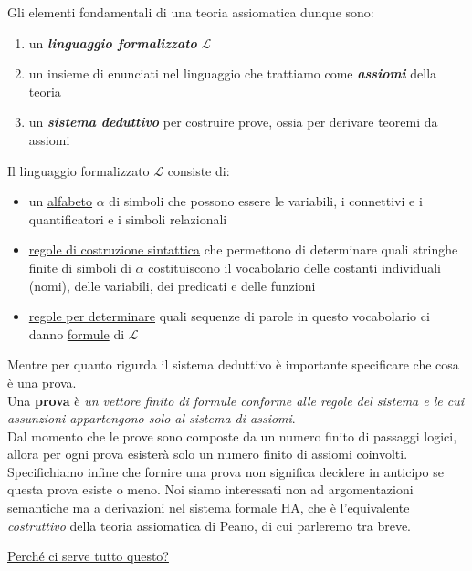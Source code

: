\vspace{0.4 cm}
Gli elementi fondamentali di una teoria assiomatica dunque sono:
\begin{enumerate}
	\item un \textsl{\textbf{linguaggio formalizzato}} $\mathcal{L}$
\item un insieme di enunciati nel linguaggio che trattiamo come \textsl{\textbf{assiomi}} della teoria
\item un \textsl{\textbf{sistema deduttivo}} per costruire prove, ossia per derivare teoremi da assiomi

\end{enumerate}
Il linguaggio formalizzato $\mathcal{L}$ consiste di:
\begin{itemize}
	\item un \underline{alfabeto} $\alpha$ di simboli che possono essere le variabili, i connettivi e i quantificatori e i simboli relazionali
\item \underline{regole di costruzione sintattica} che permettono di determinare quali stringhe finite di simboli di $\alpha$ costituiscono il vocabolario delle costanti individuali (nomi), delle variabili, dei predicati e delle funzioni
	\item \underline{regole per determinare} quali sequenze di parole in questo vocabolario  ci danno \underline{formule} di $\mathcal{L}$
\end{itemize}
\vspace{0.5 cm}
Mentre per quanto rigurda il sistema deduttivo \`e importante specificare che cosa \`e una prova.\\
Una \textbf{prova} \`e \textit{un vettore \textsl{finito} di formule conforme alle regole del sistema e le cui assunzioni appartengono solo al sistema di assiomi}.\\
Dal momento che le prove sono composte da un numero finito di passaggi logici, allora per ogni prova esister\`a solo un numero finito di assiomi coinvolti. \\
Specifichiamo infine che fornire una prova non significa decidere in anticipo se questa prova esiste o meno. Noi siamo interessati non ad argomentazioni semantiche ma a derivazioni nel sistema formale HA, che \`e l'equivalente \textsl{costruttivo} della teoria assiomatica di Peano, di cui parleremo tra breve.

\vspace{0.5 cm}

\underline{Perch\'e ci serve tutto questo?}\\
\vspace{0.2 cm}

